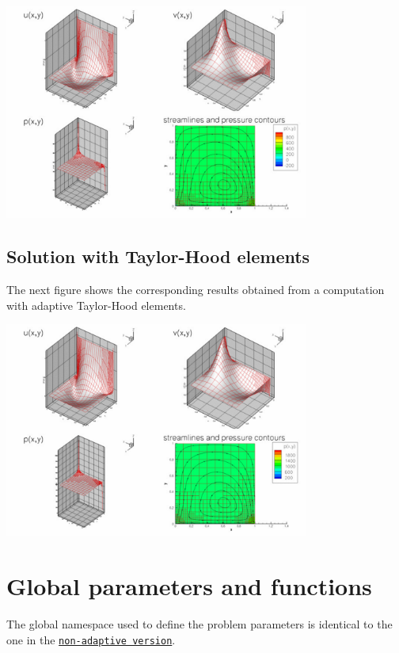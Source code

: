  
\begin{DoxyImage}
\includegraphics[width=0.75\textwidth]{adaptive_driven_cavity_CR}
\end{DoxyImage}




\hypertarget{index_TH}{}\subsection{Solution with Taylor-\/\+Hood elements}\label{index_TH}
The next figure shows the corresponding results obtained from a computation with adaptive Taylor-\/\+Hood elements.

 
\begin{DoxyImage}
\includegraphics[width=0.75\textwidth]{adaptive_driven_cavity_TH}
\end{DoxyImage}




 

\hypertarget{index_namespace}{}\section{Global parameters and functions}\label{index_namespace}
The global namespace used to define the problem parameters is identical to the one in the \href{../../driven_cavity/html/index.html#namespace}{\tt non-\/adaptive version}.

